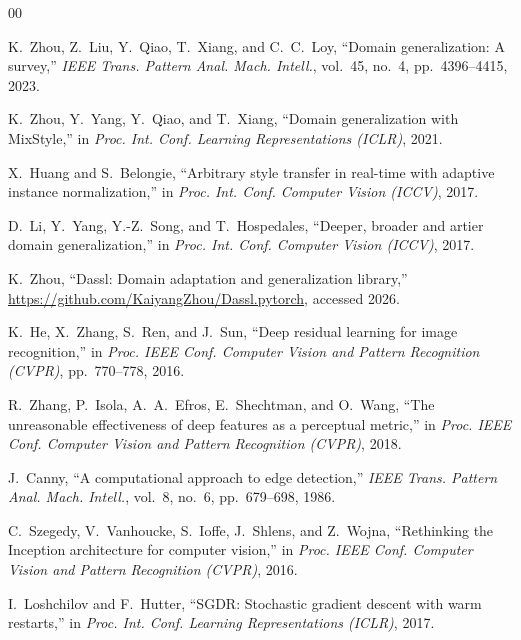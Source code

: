 



\begin{thebibliography}{00}

K.~Zhou, Z.~Liu, Y.~Qiao, T.~Xiang, and C.~C.~Loy,
``Domain generalization: A survey,''
\textit{IEEE Trans. Pattern Anal. Mach. Intell.}, vol.~45, no.~4, pp.~4396--4415, 2023.

K.~Zhou, Y.~Yang, Y.~Qiao, and T.~Xiang,
``Domain generalization with MixStyle,''
in \textit{Proc. Int. Conf. Learning Representations (ICLR)}, 2021.

X.~Huang and S.~Belongie,
``Arbitrary style transfer in real-time with adaptive instance normalization,''
in \textit{Proc. Int. Conf. Computer Vision (ICCV)}, 2017.

D.~Li, Y.~Yang, Y.-Z.~Song, and T.~Hospedales,
``Deeper, broader and artier domain generalization,''
in \textit{Proc. Int. Conf. Computer Vision (ICCV)}, 2017.

K.~Zhou, ``Dassl: Domain adaptation and generalization library,''
\url{https://github.com/KaiyangZhou/Dassl.pytorch}, accessed 2026.

K.~He, X.~Zhang, S.~Ren, and J.~Sun,
``Deep residual learning for image recognition,''
in \textit{Proc. IEEE Conf. Computer Vision and Pattern Recognition (CVPR)}, pp.~770--778, 2016.

R.~Zhang, P.~Isola, A.~A.~Efros, E.~Shechtman, and O.~Wang,
``The unreasonable effectiveness of deep features as a perceptual metric,''
in \textit{Proc. IEEE Conf. Computer Vision and Pattern Recognition (CVPR)}, 2018.

J.~Canny,
``A computational approach to edge detection,''
\textit{IEEE Trans. Pattern Anal. Mach. Intell.}, vol.~8, no.~6, pp.~679--698, 1986.

C.~Szegedy, V.~Vanhoucke, S.~Ioffe, J.~Shlens, and Z.~Wojna,
``Rethinking the Inception architecture for computer vision,''
in \textit{Proc. IEEE Conf. Computer Vision and Pattern Recognition (CVPR)}, 2016.

I.~Loshchilov and F.~Hutter,
``{SGDR}: Stochastic gradient descent with warm restarts,''
in \textit{Proc. Int. Conf. Learning Representations (ICLR)}, 2017.

\end{thebibliography}



